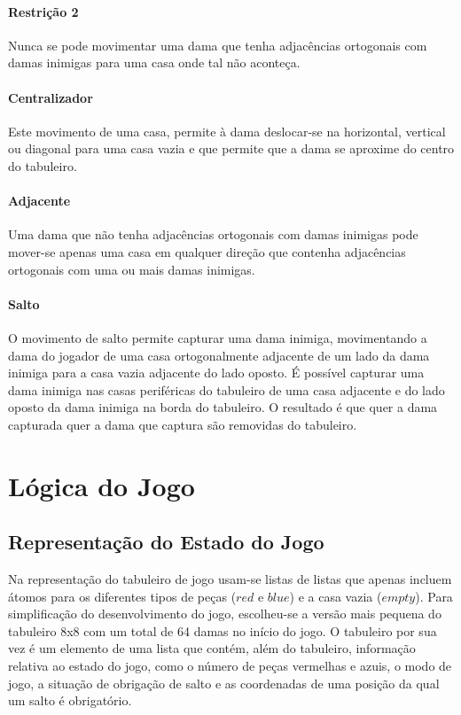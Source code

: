 \documentclass[a4paper]{article}
\begin{document}
\paragraph{Restrição 2}
Nunca se pode movimentar uma dama que tenha adjacências ortogonais com damas inimigas para uma casa onde tal não aconteça.

\paragraph{Centralizador}
Este movimento de uma casa, permite à dama deslocar-se na horizontal, vertical ou diagonal para uma casa vazia e que permite que a dama se aproxime do centro do tabuleiro.

\paragraph{Adjacente}
Uma dama que não tenha adjacências ortogonais com damas inimigas pode mover-se apenas uma casa em qualquer direção que contenha adjacências ortogonais com uma ou mais damas inimigas.

\paragraph{Salto}
O movimento de salto permite capturar uma dama inimiga, movimentando a dama do jogador de uma casa ortogonalmente adjacente de um lado da dama inimiga para a casa vazia adjacente do lado oposto. É possível capturar uma dama inimiga nas casas periféricas do tabuleiro de uma casa adjacente e do lado oposto da dama inimiga na borda do tabuleiro. O resultado é que quer a dama capturada quer a dama que captura são removidas do tabuleiro.

\section{Lógica do Jogo}

\subsection{Representação do Estado do Jogo} 
Na representação do tabuleiro de jogo usam-se listas de listas que apenas incluem
átomos para os diferentes tipos de peças ($red$ e $blue$) e a casa vazia ($empty$). Para simplificação do desenvolvimento do jogo, escolheu-se a versão mais pequena do tabuleiro 8x8 com um total de 64 damas no início do jogo. O tabuleiro por sua vez é um elemento de uma lista que contém, além do tabuleiro, informação relativa ao estado do jogo, como o número de peças vermelhas e azuis, o modo de jogo, a situação de obrigação de salto e as coordenadas de uma posição da qual um salto é obrigatório.
 
\end{document}
